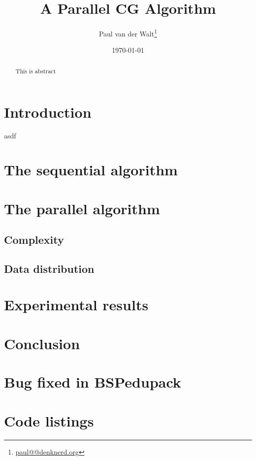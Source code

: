 \documentclass[a4paper]{article}
\author{Paul van der Walt\footnote{\url{paul@@denknerd.org}}}
\date{\today}
\title{A Parallel CG Algorithm}
\begin{document}
\maketitle

\begin{abstract}
    This is abstract
\end{abstract}

\section{Introduction}


asdf\cite{bisseling2004parallel}

\section{The sequential algorithm}


\section{The parallel algorithm}

\subsection{Complexity}

\subsection{Data distribution}


\section{Experimental results}


\section{Conclusion}


\appendix

\section{Bug fixed in BSPedupack}


\section{Code listings}




\end{document}
